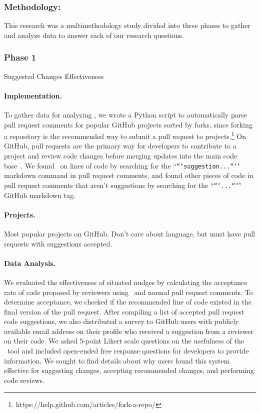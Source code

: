 
\subsubsection{Methodology:} This research was a multimethodology study divided into three phases to gather and analyze data to answer each of our research questions.

\subsubsection{Phase 1} Suggested Changes Effectiveness

\paragraph{Implementation.}

To gather data for analyzing \SUGGS, we wrote a Python script to automatically parse pull request comments for popular GitHub projects sorted by forks, since forking a repository is the recommended way to submit a pull request to projects.\footnote{https://help.github.com/articles/fork-a-repo/} On GitHub, pull requests are the primary way for developers to contribute to a project and review code changes before merging updates into the main code base~\cite{gousios2014pullrequests}. We found \SUGGS~on lines of code by searching for the ``\texttt{```suggestion...```}" markdown command  in pull request comments, and found other pieces of code in pull request comments that aren't suggestions by searching for the ``\texttt{```...```}" GitHub markdown tag.

\paragraph{Projects.}

Most popular projects on GitHub. Don't care about language, but must have pull requests with suggestions accepted.

\paragraph{Data Analysis.}

We evaluated the effectiveness of situated nudges by calculating the acceptance rate of code proposed by reviewers using \SUGGS~and normal pull request comments. To determine acceptance, we checked if the recommended line of code existed in the final version of the pull request. After compiling a list of accepted pull request code suggestions, we also distributed a survey to GitHub users with publicly available email address on their profile who received a suggestion from a reviewer on their code. We asked 5-point Likert scale questions on the usefulness of the \SUGGS~tool and included open-ended free response questions for developers to provide information. We sought to find details about why users found this system effective for suggesting changes, accepting recommended changes, and performing code reviews.

